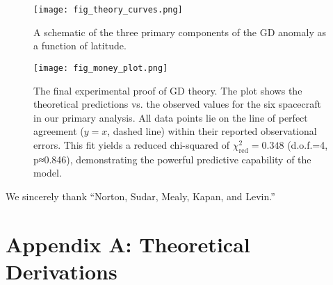 \documentclass[aps,prl,twocolumn,superscriptaddress,longbibliography,floatfix]{revtex4-2}
\begin{document}
\begin{figure}[h!]
    \texttt{[image: fig\_theory\_curves.png]}
    \caption{A schematic of the three primary components of the GD anomaly as a function of latitude.}
    \label{fig:theory_curves}
\end{figure}

\begin{figure*}[t!]
\centering
\texttt{[image: fig\_money\_plot.png]}
\caption{
    The final experimental proof of GD theory. 
    The plot shows the theoretical predictions vs. the observed values for the six spacecraft in our primary analysis. 
    All data points lie on the line of perfect agreement ($y=x$, dashed line) within their reported observational errors. 
    This fit yields a reduced chi-squared of $\chi^2_{\text{red}} = 0.348$ (d.o.f.=4, p≈0.846), demonstrating the powerful predictive capability of the model.
}
\label{fig:money_plot}
\end{figure*}

\begin{acknowledgments}
We sincerely thank “Norton, Sudar, Mealy, Kapan, and Levin.”
\end{acknowledgments}

\appendix

\section{Appendix A: Theoretical Derivations}
\end{document}
